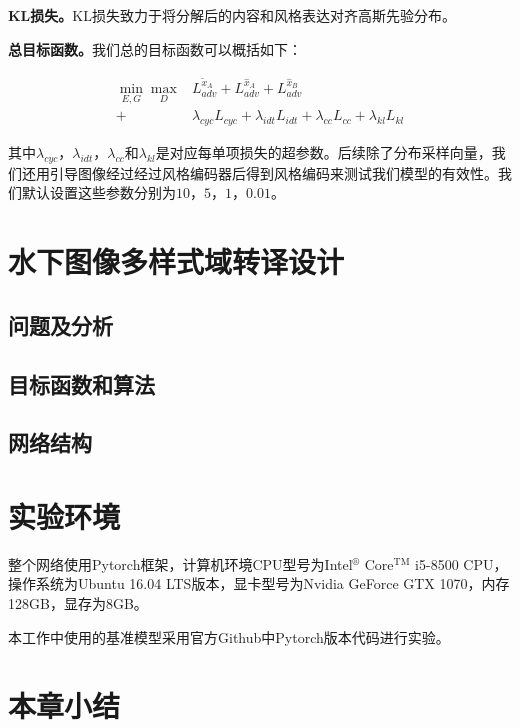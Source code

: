 \textbf{KL损失。}KL损失致力于将分解后的内容和风格表达对齐高斯先验分布。

\textbf{总目标函数。}我们总的目标函数可以概括如下：

\begin{equation}
\label{equ:full}
\begin{aligned}
\min_{E,G}\max_{D} & L_{adv}^{\tilde{x}_A}+L_{adv}^{\hat{x}_A}+L_{adv}^{\hat{x}_B} \\
+&\lambda_{cyc}L_{cyc}+\lambda_{idt}L_{idt}+\lambda_{cc}L_{cc}+\lambda_{kl}L_{kl}
\end{aligned}
\end{equation}

其中$\lambda_{cyc}$，$\lambda_{idt}$，$\lambda_{cc}$和$\lambda_{kl}$是对应每单项损失的超参数。后续除了分布采样向量，我们还用引导图像经过经过风格编码器后得到风格编码来测试我们模型的有效性。我们默认设置这些参数分别为$10$，$5$，$1$，$0.01$。

\section{水下图像多样式域转译设计}

\subsection{问题及分析}
\subsection{目标函数和算法}
\subsection{网络结构}

\section{实验环境}
整个网络使用Pytorch框架，计算机环境CPU型号为Intel$^\circledR$ Core$^{\text{TM}}$ i5-8500 CPU，操作系统为Ubuntu 16.04 LTS版本，显卡型号为Nvidia GeForce GTX 1070，内存128GB，显存为8GB。

本工作中使用的基准模型采用官方Github中Pytorch版本代码进行实验。

\section{本章小结}
